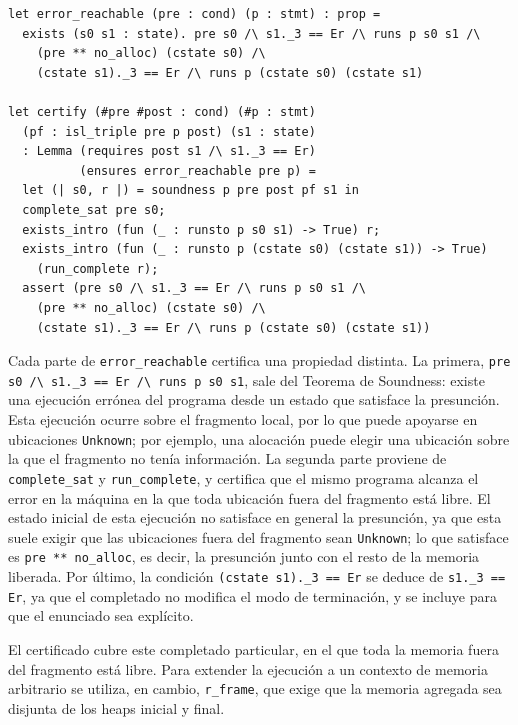 \documentclass[a4paper,	11pt]{report}
\begin{document}
\begin{lstlisting}
let error_reachable (pre : cond) (p : stmt) : prop =
  exists (s0 s1 : state). pre s0 /\ s1._3 == Er /\ runs p s0 s1 /\
    (pre ** no_alloc) (cstate s0) /\
    (cstate s1)._3 == Er /\ runs p (cstate s0) (cstate s1)

let certify (#pre #post : cond) (#p : stmt)
  (pf : isl_triple pre p post) (s1 : state)
  : Lemma (requires post s1 /\ s1._3 == Er)
          (ensures error_reachable pre p) =
  let (| s0, r |) = soundness p pre post pf s1 in
  complete_sat pre s0;
  exists_intro (fun (_ : runsto p s0 s1) -> True) r;
  exists_intro (fun (_ : runsto p (cstate s0) (cstate s1)) -> True)
    (run_complete r);
  assert (pre s0 /\ s1._3 == Er /\ runs p s0 s1 /\
    (pre ** no_alloc) (cstate s0) /\
    (cstate s1)._3 == Er /\ runs p (cstate s0) (cstate s1))
\end{lstlisting}

Cada parte de \lstinline|error_reachable| certifica una propiedad distinta.
La primera,
\lstinline|pre s0 /\ s1._3 == Er /\ runs p s0 s1|,
sale del Teorema de Soundness:
existe una ejecución errónea del programa desde un estado que satisface la presunción.
Esta ejecución ocurre sobre el fragmento local,
por lo que puede apoyarse en ubicaciones \lstinline|Unknown|;
por ejemplo,
una alocación puede elegir una ubicación sobre la que el fragmento no tenía información.
La segunda parte proviene de \lstinline|complete_sat| y \lstinline|run_complete|,
y certifica que el mismo programa alcanza el error en la máquina en la que toda ubicación fuera del fragmento está libre.
El estado inicial de esta ejecución no satisface en general la presunción,
ya que esta suele exigir que las ubicaciones fuera del fragmento sean \lstinline|Unknown|;
lo que satisface es \lstinline|pre ** no_alloc|,
es decir,
la presunción junto con el resto de la memoria liberada.
Por último,
la condición \lstinline|(cstate s1)._3 == Er| se deduce de \lstinline|s1._3 == Er|,
ya que el completado no modifica el modo de terminación,
y se incluye para que el enunciado sea explícito.

El certificado cubre este completado particular,
en el que toda la memoria fuera del fragmento está libre.
Para extender la ejecución a un contexto de memoria arbitrario se utiliza,
en cambio,
\lstinline|r_frame|,
que exige que la memoria agregada sea disjunta de los heaps inicial y final.

\end{document}
